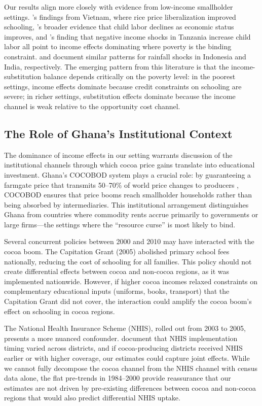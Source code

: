\documentclass[12pt]{article}
\begin{document}
Our results align more closely with evidence from low-income smallholder settings. \citet{edmonds2005}'s findings from Vietnam, where rice price liberalization improved schooling, \citet{edmonds2005b}'s broader evidence that child labor declines as economic status improves, and \citet{beegle2006}'s finding that negative income shocks in Tanzania increase child labor all point to income effects dominating where poverty is the binding constraint. \citet{maccini2009} and \citet{shah2017} document similar patterns for rainfall shocks in Indonesia and India, respectively. The emerging pattern from this literature is that the income-substitution balance depends critically on the poverty level: in the poorest settings, income effects dominate because credit constraints on schooling are severe; in richer settings, substitution effects dominate because the income channel is weak relative to the opportunity cost channel.

\subsection{The Role of Ghana's Institutional Context}

The dominance of income effects in our setting warrants discussion of the institutional channels through which cocoa price gains translate into educational investment. Ghana's COCOBOD system plays a crucial role: by guaranteeing a farmgate price that transmits 50--70\% of world price changes to producers \citep{kolavalli2011}, COCOBOD ensures that price booms reach smallholder households rather than being absorbed by intermediaries. This institutional arrangement distinguishes Ghana from countries where commodity rents accrue primarily to governments or large firms---the settings where the ``resource curse'' \citep{sachs2001, vanderploeg2011} is most likely to bind.

Several concurrent policies between 2000 and 2010 may have interacted with the cocoa boom. The Capitation Grant (2005) abolished primary school fees nationally, reducing the cost of schooling for all families. This policy should not create differential effects between cocoa and non-cocoa regions, as it was implemented nationwide. However, if higher cocoa incomes relaxed constraints on complementary educational inputs (uniforms, books, transport) that the Capitation Grant did not cover, the interaction could amplify the cocoa boom's effect on schooling in cocoa regions.

The National Health Insurance Scheme (NHIS), rolled out from 2003 to 2005, presents a more nuanced confounder. \citet{garcia2021} document that NHIS implementation timing varied across districts, and if cocoa-producing districts received NHIS earlier or with higher coverage, our estimates could capture joint effects. While we cannot fully decompose the cocoa channel from the NHIS channel with census data alone, the flat pre-trends in 1984--2000 provide reassurance that our estimates are not driven by pre-existing differences between cocoa and non-cocoa regions that would also predict differential NHIS uptake.
\end{document}
